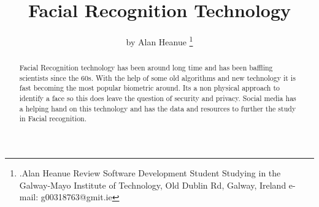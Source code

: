 \documentclass[report]{IEEEtran}
\begin{document}
\title{Facial Recognition Technology }
\author{by Alan Heanue  %
\thanks{.\newline Alan Heanue Review 
Software Development Student Studying in the Galway-Mayo Institute of Technology, Old Dublin Rd, Galway, Ireland 
e-mail: g00318763@gmit.ie}%
}

\maketitle

\begin{abstract}
Facial Recognition technology has been around long time and has been baffling scientists since the 60s. With the help of some old algorithms and new technology it is fast becoming the most popular biometric around. Its a non physical approach to identify a face so this does leave the question of security and privacy. Social media has a helping hand on this technology and has the data and resources to further the study in Facial recognition.
\end{abstract}
\end{document}

